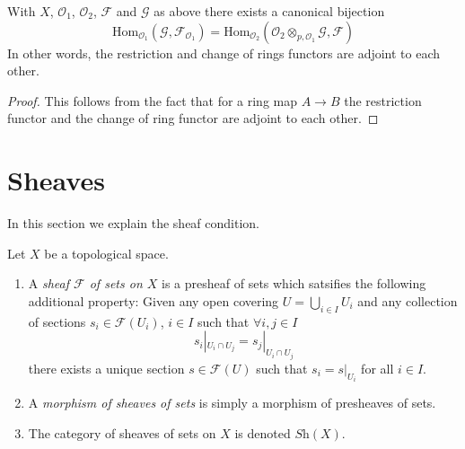 \begin{lemma}
\label{lemma-adjointness-tensor-restrict-presheaves}
With $X$, $\mathcal{O}_1$, $\mathcal{O}_2$, $\mathcal{F}$ and
$\mathcal{G}$ as above there exists a canonical bijection
$$
\text{Hom}_{\mathcal{O}_1}(\mathcal{G}, \mathcal{F}_{\mathcal{O}_1})
=
\text{Hom}_{\mathcal{O}_2}(
\mathcal{O}_2 \otimes_{p, \mathcal{O}_1} \mathcal{G},
\mathcal{F}
)
$$
In other words, the restriction and change of rings functors
are adjoint to each other.
\end{lemma}

\begin{proof}
This follows from the fact that for a ring map
$A \to B$ the restriction functor and the change
of ring functor are adjoint to each other.
\end{proof}





\section{Sheaves}
\label{section-sheaves}

\noindent
In this section we explain the sheaf condition.

\begin{definition}
\label{definition-sheaf}
Let $X$ be a topological space.
\begin{enumerate}
\item A {\it sheaf $\mathcal{F}$ of sets on $X$} is a presheaf
of sets which satsifies the following additional property: Given
any open covering $U = \bigcup_{i \in I} U_i$ and any collection
of sections $s_i \in \mathcal{F}(U_i)$, $i \in I$ such that
$\forall i, j\in I$
$$
s_i|_{U_i \cap U_j} = s_j|_{U_i \cap U_j}
$$
there exists a unique section $s \in \mathcal{F}(U)$ such that
$s_i = s|_{U_i}$ for all $i \in I$.
\item A {\it morphism of sheaves of sets} is simply a
morphism of presheaves of sets.
\item The category of sheaves of sets on $X$ is denoted
$\textit{Sh}(X)$.
\end{enumerate}
\end{definition}

